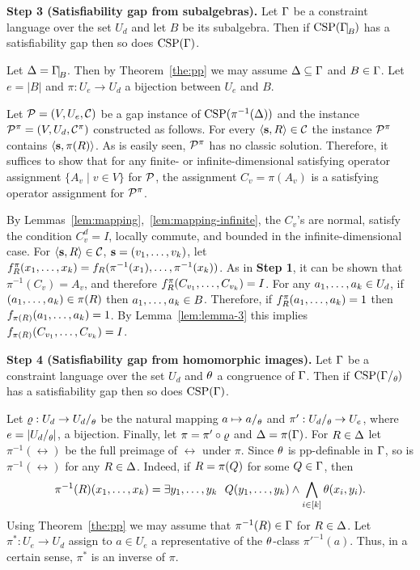 \medskip

{\bf Step 3 (Satisfiability gap from subalgebras).}
Let $\Gamma$ be a constraint language over the set $U_d$ and let $B$ be its subalgebra.
Then if $\CSP(\Gm\red B)$ has a satisfiability gap then so does ${\rm CSP}(\Gamma)$.

\smallskip

Let $\Dl=\Gm\red B$. Then by Theorem~\ref{the:pp} we may assume $\Delta\subseteq\Gamma$ and $B\in\Gamma$. Let $e=|B|$ and $\pi:U_e\to U_d$ a bijection between $U_e$ and $B$. 

Let ${\mathcal P}=(V,U_e,{\mathcal C})$ be a gap instance of ${\rm CSP}(\pi^{-1}(\Delta))$ and the instance ${\mathcal P}^\pi=(V,U_d,{\mathcal C}^\pi)$ constructed as follows. For every $\langle {\bf s},R \rangle\in{\mathcal C}$ the instance ${\mathcal P}^\pi$ contains $\langle {\bf s},\pi(R) \rangle$. As is easily seen, ${\mathcal P}^\pi$ has no classic solution. Therefore, it suffices to show that for any finite- or infinite-dimensional satisfying operator assignment $\{A_v\mid v\in V\}$ for ${\mathcal P}$, the assignment $C_v=\pi(A_v)$ is a satisfying operator assignment for ${\mathcal P}^\pi$.

By Lemmas~\ref{lem:mapping},~\ref{lem:mapping-infinite}, the $C_v$'s are normal, satisfy the condition $C_v^d=I$, locally commute, and bounded in the infinite-dimensional case. For $\langle {\bf s},R \rangle\in{\mathcal C}$, ${\bf s}=(v _1,\ldots, v _{k})$, let $f^\pi_R(x _1,\ldots, x _{k})=f_R(\pi^{-1}(x_1),\ldots,\pi^{-1}(x_k))$. As in \textbf{Step 1}, it can be shown that $\pi^{-1}(C_v)=A_v$, and therefore $f^\pi_R(C_{v_1},\ldots, C_{v_k})=I$. For any $a _1,\ldots, a _{k}\in U_d$, if $(a _1,\ldots, a _{k})\in\pi(R)$ then $a _1,\ldots, a _{k}\in B$. Therefore, if $f^\pi_R(a _1,\ldots, a _{k})=1$ then $f_{\pi(R)}(a _1,\ldots, a _{k})=1$. By Lemma~\ref{lem:lemma-3} this implies $f_{\pi(R)}(C_{v_1},\ldots, C_{v_k})=I$.

\smallskip

{\bf Step 4 (Satisfiability gap from homomorphic images).}
Let $\Gamma$ be a constraint language over the set $U_d$ and $\theta$ a congruence of
$\Gamma$.  Then if $\CSP(\Gm\fac\th)$ has a satisfiability gap then so does ${\rm CSP}(\Gamma)$.

\smallskip

Let $\vr:U_d\to U_d\fac\th$ be the natural mapping $a\mapsto a\fac\th$ and $\pi':U_d\fac\th\to U_e$, where $e=|U_d\fac\th|$, a bijection. Finally, let $\pi=\pi'\circ\varrho$ and $\Delta=\pi(\Gamma)$. For $R\in\Delta$ let $\pi^{-1}(\rel)$ be the full preimage of $\rel$ under $\pi$. Since $\theta$ is pp-definable in $\Gamma$, so is $\pi^{-1}(\rel)$ for any $R\in\Delta$. Indeed, if $R=\pi(Q)$ for some $Q\in\Gamma$, then 
\[
\pi^{-1}(R)(x _1,\ldots, x _{k})=\exists y _1,\ldots, y _{k}\ \ Q(y _1,\ldots, y _{k})\wedge\bigwedge_{i\in[k]}\theta(x_i,y_i).
\]
Using Theorem~\ref{the:pp} we may assume that $\pi^{-1}(R)\in\Gamma$ for $R\in\Delta$. Let $\pi^*:U_e\to U_d$ assign to $a\in U_e$ a representative of the $\theta$-class $\pi'^{-1}(a)$. Thus, in a certain sense, $\pi^*$ is an inverse of $\pi$.  

